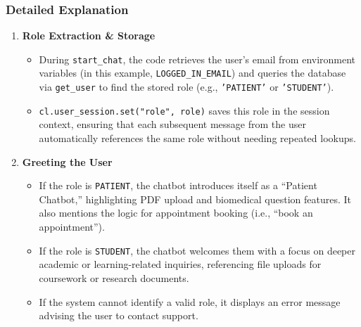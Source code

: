 \subsubsection*{Detailed Explanation}

\begin{enumerate}
    \item \textbf{Role Extraction \& Storage}
    \begin{itemize}
        \item During \texttt{start\_chat}, the code retrieves the user’s email from environment variables (in this example, \texttt{LOGGED\_IN\_EMAIL}) and queries the database via \texttt{get\_user} to find the stored role (e.g., \texttt{'PATIENT'} or \texttt{'STUDENT'}).
        \item \texttt{cl.user\_session.set("role", role)} saves this role in the session context, ensuring that each subsequent message from the user automatically references the same role without needing repeated lookups.
    \end{itemize}

    \item \textbf{Greeting the User}
    \begin{itemize}
        \item If the role is \texttt{PATIENT}, the chatbot introduces itself as a “Patient Chatbot,” highlighting PDF upload and biomedical question features. It also mentions the logic for appointment booking (i.e., “book an appointment”).
        \item If the role is \texttt{STUDENT}, the chatbot welcomes them with a focus on deeper academic or learning-related inquiries, referencing file uploads for coursework or research documents.
        \item If the system cannot identify a valid role, it displays an error message advising the user to contact support.
    \end{itemize}


\end{enumerate}
